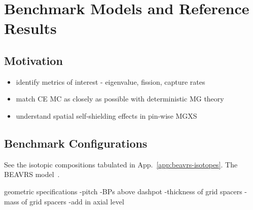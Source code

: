 \chapter{Benchmark Models and Reference Results}
\label{chap:benchmarks}

\section{Motivation}
\label{sec:chap7-motivate}

\begin{itemize}[noitemsep]
  \item identify metrics of interest - eigenvalue, fission, capture rates
  \item match CE MC as closely as possible with deterministic MG theory
  \item understand spatial self-shielding effects in pin-wise MGXS
\end{itemize}


\section{Benchmark Configurations}
\label{sec:chap7-benchmarks}

See the isotopic compositions tabulated in App.~\ref{app:beavrs-isotopes}. The \ac{BEAVRS} model~\cite{horelik2013beavrs}.

geometric specifications
-pitch
-\ac{BP}s above dashpot
-thickness of grid spacers
-mass of grid spacers
-add in axial level


